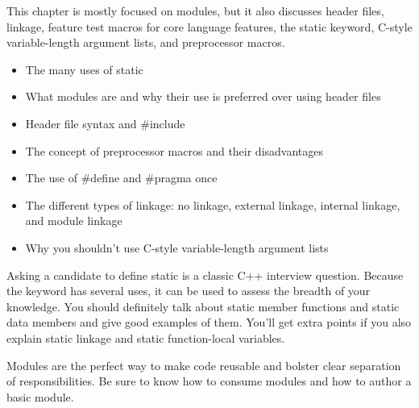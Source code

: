 
This chapter is mostly focused on modules, but it also discusses header files, linkage, feature test macros for core language features, the static keyword, C-style variable-length argument lists, and preprocessor macros.


\begin{itemize}
\item
The many uses of static

\item
What modules are and why their use is preferred over using header files

\item
Header file syntax and \#include

\item
The concept of preprocessor macros and their disadvantages

\item
The use of \#define and \#pragma once

\item
The different types of linkage: no linkage, external linkage, internal linkage, and module linkage

\item
Why you shouldn’t use C-style variable-length argument lists
\end{itemize}


Asking a candidate to define static is a classic C++ interview question. Because the keyword has several uses, it can be used to assess the breadth of your knowledge. You should definitely talk about static member functions and static data members and give good examples of them. You’ll get extra points if you also explain static linkage and static function-local variables.

Modules are the perfect way to make code reusable and bolster clear separation of responsibilities. Be sure to know how to consume modules and how to author a basic module.








